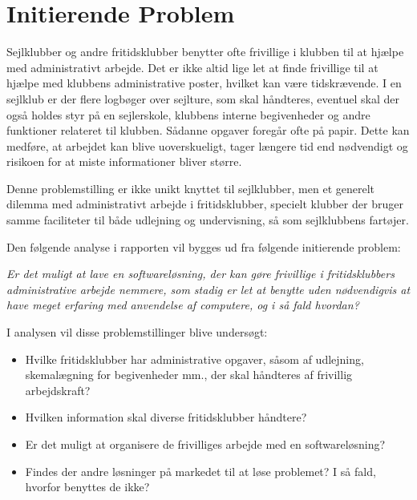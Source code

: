 \section{Initierende Problem}

Sejlklubber og andre fritidsklubber benytter ofte frivillige i klubben til at hjælpe med administrativt
arbejde. Det er ikke altid lige let at finde frivillige til at hjælpe med klubbens administrative poster,
hvilket kan være tidskrævende. I en sejlklub er der flere
logbøger over sejlture, som skal håndteres, eventuel skal der også holdes styr på en sejlerskole, klubbens
interne begivenheder og andre funktioner relateret til klubben. Sådanne opgaver foregår ofte på papir. Dette
kan medføre, at arbejdet kan blive uoverskueligt, tager længere tid end nødvendigt og risikoen for at miste
informationer bliver større. 

Denne problemstilling er ikke unikt knyttet til sejlklubber, men et generelt dilemma med administrativt
arbejde i fritidsklubber, specielt klubber der bruger samme faciliteter til både udlejning og undervisning, så
som sejlklubbens fartøjer.

Den følgende analyse  i rapporten vil bygges ud fra følgende initierende problem:

\textit{Er det muligt at lave en softwareløsning, der kan gøre frivillige i fritidsklubbers administrative
arbejde nemmere, som stadig er let at benytte uden nødvendigvis at have meget erfaring med anvendelse af
computere, og i så fald hvordan?}

I analysen vil disse problemstillinger blive undersøgt:

\begin{itemize}
  \item Hvilke fritidsklubber har administrative opgaver, såsom af udlejning, skemalægning for begivenheder mm., der
        skal håndteres af frivillig arbejdskraft?
  \item Hvilken information skal diverse fritidsklubber håndtere?
  \item Er det muligt at organisere de frivilliges arbejde med en softwareløsning?
  \item Findes der andre løsninger på markedet til at løse problemet? I så fald, hvorfor benyttes de ikke?
\end{itemize}